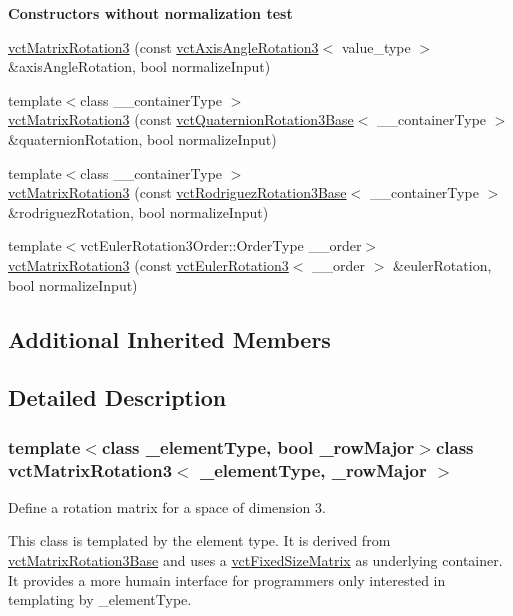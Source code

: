 \begin{Indent}{\bf Constructors without normalization test}
\begin{DoxyCompactItemize}
\item 
\hyperlink{classvct_matrix_rotation3_a794a818e661b4ed6c939a5e28cde63c5}{vct\+Matrix\+Rotation3} (const \hyperlink{classvct_axis_angle_rotation3}{vct\+Axis\+Angle\+Rotation3}$<$ value\+\_\+type $>$ \&axis\+Angle\+Rotation, bool normalize\+Input)
\item 
{\footnotesize template$<$class \+\_\+\+\_\+container\+Type $>$ }\\\hyperlink{classvct_matrix_rotation3_a6f1638454552739b6c9278ae408ed980}{vct\+Matrix\+Rotation3} (const \hyperlink{classvct_quaternion_rotation3_base}{vct\+Quaternion\+Rotation3\+Base}$<$ \+\_\+\+\_\+container\+Type $>$ \&quaternion\+Rotation, bool normalize\+Input)
\item 
{\footnotesize template$<$class \+\_\+\+\_\+container\+Type $>$ }\\\hyperlink{classvct_matrix_rotation3_a3b60836c3ba914b556aa7a4576e35b7f}{vct\+Matrix\+Rotation3} (const \hyperlink{classvct_rodriguez_rotation3_base}{vct\+Rodriguez\+Rotation3\+Base}$<$ \+\_\+\+\_\+container\+Type $>$ \&rodriguez\+Rotation, bool normalize\+Input)
\item 
{\footnotesize template$<$vct\+Euler\+Rotation3\+Order\+::\+Order\+Type \+\_\+\+\_\+order$>$ }\\\hyperlink{classvct_matrix_rotation3_afc300c7621a339cfe1d6dfeeeb9c592a}{vct\+Matrix\+Rotation3} (const \hyperlink{classvct_euler_rotation3}{vct\+Euler\+Rotation3}$<$ \+\_\+\+\_\+order $>$ \&euler\+Rotation, bool normalize\+Input)
\end{DoxyCompactItemize}
\end{Indent}
\subsection*{Additional Inherited Members}


\subsection{Detailed Description}
\subsubsection*{template$<$class \+\_\+element\+Type, bool \+\_\+row\+Major$>$class vct\+Matrix\+Rotation3$<$ \+\_\+element\+Type, \+\_\+row\+Major $>$}

Define a rotation matrix for a space of dimension 3. 

This class is templated by the element type. It is derived from \hyperlink{classvct_matrix_rotation3_base}{vct\+Matrix\+Rotation3\+Base} and uses a \hyperlink{classvct_fixed_size_matrix}{vct\+Fixed\+Size\+Matrix} as underlying container. It provides a more humain interface for programmers only interested in templating by \+\_\+element\+Type.


